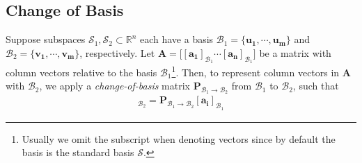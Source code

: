 \subsection{Change of Basis}

\begin{definition}
  \noindent Suppose subspaces $\mathcal{S}_1,\mathcal{S}_2\subset\mathbb{R}^n$ each have a basis $\mathcal{B}_1=\{\bm{u_1},\cdots,\bm{u_m}\}$ and $\mathcal{B}_2=\{\bm{v_1},\cdots,\bm{v_m}\}$, respectively. Let $\bm{A}=\Big[[\bm{a_1}]_{\mathcal{B}_1}\cdots[\bm{a_n}]_{\mathcal{B}_1}\Big]$ be a matrix with column vectors relative to the basis $\mathcal{B}_1$\footnote{Usually we omit the subscript when denoting vectors since by default the basis is the standard basis $\mathcal{S}$.}. Then, to represent column vectors in $\bm{A}$ with $\mathcal{B}_2$, we apply a \emph{change-of-basis} matrix $\bm{P}_{\mathcal{B}_1\rightarrow\mathcal{B}_2}$ from $\mathcal{B}_1$ to $\mathcal{B}_2$, such that 
  \begin{align}
    [\bm{a_i}]_{\mathcal{B}_2}=\bm{P}_{\mathcal{B}_1\rightarrow\mathcal{B}_2}[\bm{a_i}]_{\mathcal{B}_1}
  \end{align}
\end{definition}

